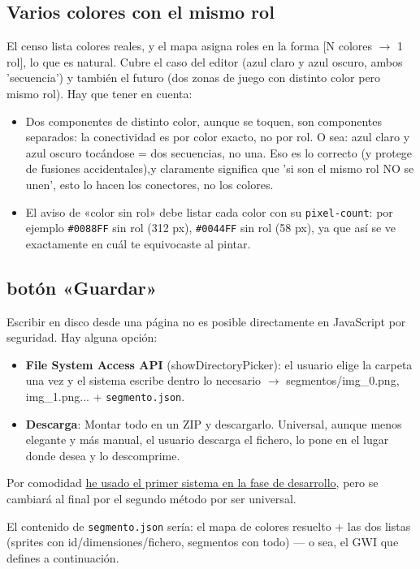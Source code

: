 \subsection{Varios colores con el mismo rol}
El censo lista colores reales, y el mapa asigna roles en la forma [N colores $\rightarrow$  1 rol], lo que es natural. Cubre el caso del editor (azul claro y azul oscuro, ambos 'secuencia') y también el futuro (dos zonas de juego con distinto color pero mismo rol). Hay que tener en cuenta:
\begin{itemize}
	\item Dos componentes de distinto color, aunque se toquen, son componentes separados: la conectividad es por color exacto, no por rol. O sea: azul claro y azul oscuro tocándose = dos secuencias, no una. Eso es lo correcto (y protege de fusiones accidentales),y claramente significa que 'si son el mismo rol NO se unen', esto lo hacen los conectores, no los colores.
	\item El aviso de «color sin rol» debe listar cada color con su \texttt{pixel-count}: por ejemplo \texttt{\#0088FF} sin rol (312 px), \texttt{\#0044FF} sin rol (58 px), ya que así se ve exactamente en cuál te equivocaste al pintar.
	
	
\end{itemize}

\subsection{botón «Guardar»}
Escribir en disco desde una página no es posible directamente en JavaScript por seguridad. Hay alguna opción:
\begin{itemize}
	\item \textbf{File System Access API} (showDirectoryPicker): el usuario elige la carpeta una vez y el sistema escribe dentro lo necesario $\longrightarrow$ segmentos/img\_0.png, img\_1.png... + \texttt{segmento.json}.  
 	\item \textbf{Descarga}: Montar todo en un ZIP y descargarlo. Universal, aunque menos elegante y más manual, el usuario descarga el fichero, lo pone en el lugar donde desea y lo descomprime.
\end{itemize}

Por comodidad \underline{he usado el primer sistema en la fase de desarrollo}, pero se cambiará al final por el segundo método por ser universal.

El contenido de \texttt{segmento.json} sería: el mapa de colores resuelto + las dos listas (sprites con id/dimensiones/fichero, segmentos con todo) — o sea, el GWI que defines a continuación.

